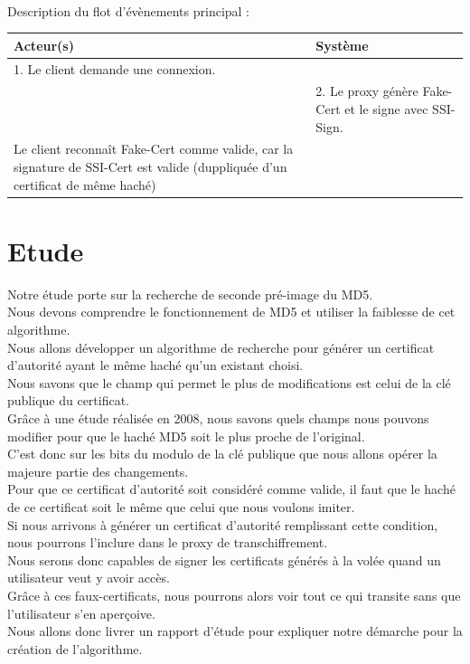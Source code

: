 \documentclass[a4paper,11pt,french]{article}
\begin{document}
~\\

Description du flot d'évènements principal :

\begin{tabular}{|m{8cm}|m{8cm}|}
   \hline
  \rowcolor[gray]{.8} Acteur(s) & Système \\
   \hline
   1. Le client demande une connexion. & \\
   \hline
&    2. Le proxy génère Fake-Cert et le signe avec SSI-Sign.  \\
   \hline
 Le client reconnaît Fake-Cert comme valide, car la signature de SSI-Cert est valide (duppliquée d'un certificat de même haché) & \\
\hline
\end{tabular}



\section{Etude}

Notre étude porte sur la recherche de seconde pré-image du MD5.\\
Nous devons comprendre le fonctionnement de MD5 et utiliser la faiblesse de cet algorithme.\\
Nous allons développer un algorithme de recherche pour générer un certificat d'autorité ayant le même haché qu'un existant choisi.\\
Nous savons que le champ qui permet le plus de modifications est celui de la clé publique du certificat.\\
Grâce à une étude réalisée en 2008, nous savons quels champs nous pouvons modifier pour que le haché MD5 soit le plus proche de l'original.\\
C'est donc sur les bits du modulo de la clé publique que nous allons opérer la majeure partie des changements.\\
Pour que ce certificat d'autorité soit considéré comme valide, il faut que le haché de ce certificat soit le même que celui que nous voulons imiter.\\
Si nous arrivons à générer un certificat d'autorité remplissant cette condition, nous pourrons l'inclure dans le proxy de transchiffrement.\\
Nous serons donc capables de signer les certificats générés à la volée quand un utilisateur veut y avoir accès.\\
Grâce à ces faux-certificats, nous pourrons alors voir tout ce qui transite sans que l'utilisateur s'en aperçoive.\\
Nous allons donc livrer un rapport d'étude pour expliquer notre démarche pour la création de l'algorithme.\\
\end{document}
